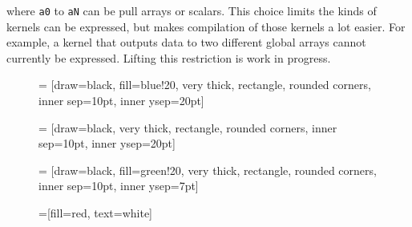 \noindent
where {\tt a0} to {\tt aN} can be pull arrays or scalars. This choice 
limits the kinds of kernels can be expressed, but
makes compilation of those kernels a lot easier.
For example, a kernel that outputs data to two different global
arrays cannot currently be expressed. Lifting this restriction 
is work in progress.  




\begin{figure} 
\def\s{.50}

 = [draw=black, fill=blue!20, very thick,
    rectangle, rounded corners, inner sep=10pt, inner ysep=20pt]

 = [draw=black, very thick,
    rectangle, rounded corners, inner sep=10pt, inner ysep=20pt]

 = [draw=black, fill=green!20, very thick,
    rectangle, rounded corners, inner sep=10pt, inner ysep=7pt]

 =[fill=red, text=white]

\end{figure}
